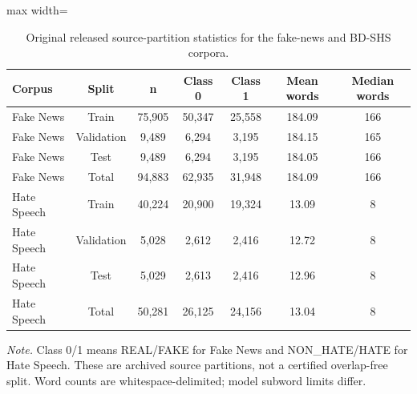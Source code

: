 \begin{table}[t]
\centering
\caption{Original released source-partition statistics for the fake-news and BD-SHS corpora.}
\label{tab:datastats}
\footnotesize
\begin{adjustbox}{max width=\linewidth}
\begin{tabular}{lcccccc}
\toprule
Corpus & Split & n & Class 0 & Class 1 & Mean words & Median words \\
\midrule
Fake News & Train & 75,905 & 50,347 & 25,558 & 184.09 & 166 \\
Fake News & Validation & 9,489 & 6,294 & 3,195 & 184.15 & 165 \\
Fake News & Test & 9,489 & 6,294 & 3,195 & 184.05 & 166 \\
Fake News & Total & 94,883 & 62,935 & 31,948 & 184.09 & 166 \\
Hate Speech & Train & 40,224 & 20,900 & 19,324 & 13.09 & 8 \\
Hate Speech & Validation & 5,028 & 2,612 & 2,416 & 12.72 & 8 \\
Hate Speech & Test & 5,029 & 2,613 & 2,416 & 12.96 & 8 \\
Hate Speech & Total & 50,281 & 26,125 & 24,156 & 13.04 & 8 \\
\bottomrule
\end{tabular}
\end{adjustbox}
\par\vspace{2pt}
\begin{minipage}{\linewidth}
\scriptsize\emph{Note.} Class 0/1 means REAL/FAKE for Fake News and NON\_HATE/HATE for Hate Speech. These are archived source partitions, not a certified overlap-free split. Word counts are whitespace-delimited; model subword limits differ.
\end{minipage}
\end{table}

